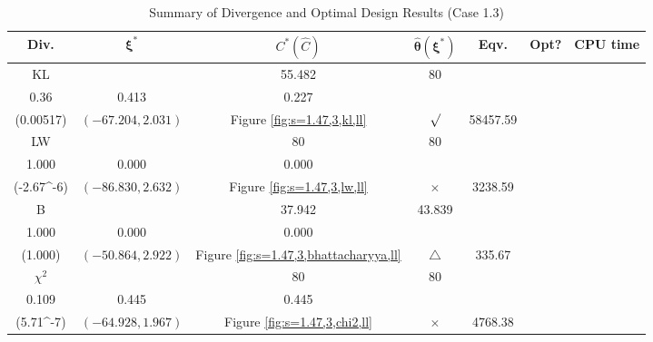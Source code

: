 \documentclass[12pt, a4paper]{article}
\begin{document}
\begin{table}[H]
\centering
\renewcommand{\arraystretch}{1.5} %
\setlength{\tabcolsep}{8pt} %
\begin{tabular}{|c|c|c|c|c|c|c|}
\hline
\textbf{Div.} & \(\boldsymbol{\xi^*}\) & \(C^* (\hat{C})\) & \(\boldsymbol{\hat{\theta}(\xi^*)}\) & \textbf{Eqv.} & \textbf{Opt?} & \textbf{CPU time} \\
\hline
KL & \(\left\{\begin{array}{ccc}
29.699 & 55.482 & 80 \\
0.36 & 0.413 & 0.227
\end{array}\right\}\) &
\(\begin{array}{c}
0.00517 \\
(0.00517)
\end{array}\) & 
\((-67.204, 2.031)\) & 
Figure \ref{fig:s=1.47,3,kl,ll} & $\surd$ & 58457.59 \\
\hline
LW & \(\left\{\begin{array}{ccc}
79.41 & 80 & 80 \\
1.000 & 0.000 & 0.000
\end{array}\right\}\) &
\(\begin{array}{c}
0.693 \\
(-2.67\times 10^{-6})
\end{array}\) & 
\((-86.830, 2.632)\) & 
Figure \ref{fig:s=1.47,3,lw,ll} & $\times$ & 3238.59 \\
\hline
B & \(\left\{\begin{array}{ccc}
21.036 & 37.942 & 43.839 \\
1.000 & 0.000 & 0.000
\end{array}\right\}\) &
\(\begin{array}{c}
4.66\times 10^{-75} \\
(1.000)
\end{array}\) & 
\((-50.864, 2.922)\) & 
Figure \ref{fig:s=1.47,3,bhattacharyya,ll} & $\triangle$ & 335.67 \\
\hline
\(\chi^2\) & \(\left\{\begin{array}{ccc}
80 & 80 & 80 \\
0.109 & 0.445 & 0.445
\end{array}\right\}\) &
\(\begin{array}{c}
4.44\times 10^{11} \\
(5.71\times 10^{-7})
\end{array}\) & 
\((-64.928, 1.967)\) & 
Figure \ref{fig:s=1.47,3,chi2,ll} & $\times$ & 4768.38 \\
\hline
\end{tabular}
\caption{Summary of Divergence and Optimal Design Results (Case 1.3)}
\label{tab:results1.3}
\end{table}
\end{document}
